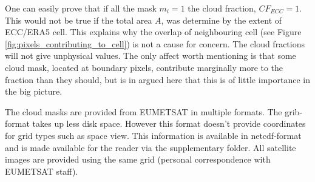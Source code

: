 One can easily prove that if all the mask $m_i = 1$ the cloud fraction, $CF_{ECC}=1$. This would not be true if the total area $A$, was determine by the extent of ECC/ERA5 cell. This explains why the overlap of neighbouring cell (see Figure \ref{fig:pixels_contributing_to_cell}) is not a cause for concern. The cloud fractions will not give unphysical values. The only affect worth mentioning is that some cloud mask, located at boundary pixels, contribute marginally more to the fraction than they should, but is in argued here that this is of little importance in the big picture.



The cloud masks are provided from EUMETSAT in multiple formats. The \acrshort{grib}-format takes up less disk space. However this format doesn't provide coordinates for grid types such as space view. This information is available in \acrshort{netcdf}-format and is made available for the reader via the supplementary folder. All satellite images are provided using the same grid (personal correspondence with EUMETSAT staff). 

